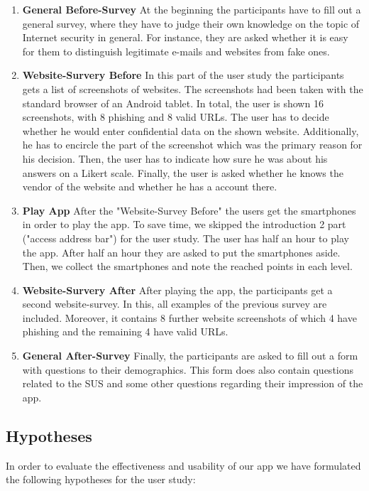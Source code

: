 \begin{enumerate}
	\item \textbf{General Before-Survey} At the beginning the participants have to fill out a general survey, where they have to judge their own knowledge on the topic of Internet security in general. For instance, they are asked whether it is easy for them to distinguish legitimate e-mails and websites from fake ones.
	\item \textbf{Website-Survery Before} In this part of the user study the participants gets a list of screenshots of websites. The screenshots had been taken with the standard browser of an Android tablet. In total, the user is shown 16 screenshots, with 8 phishing and 8 valid URLs. The user has to decide whether he would enter confidential data on the shown website. Additionally, he has to encircle the part of the screenshot which was the primary reason for his decision. Then, the user has to indicate how sure he was about his answers on a Likert scale. Finally, the user is asked whether he knows the vendor of the website and whether he has a account there.
	\item \textbf{Play App} After the "Website-Survey Before" the users get the smartphones in order to play the app. To save time, we skipped the introduction 2 part ("access address bar") for the user study. The user has half an hour to play the app. After half an hour they are asked to put the smartphones aside. Then, we collect the smartphones and note the reached points in each level.
	\item \textbf{Website-Survery After} After playing the app, the participants get a second website-survey. In this, all examples of the previous survey are included. Moreover, it contains 8 further website screenshots of which 4 have phishing and the remaining 4 have valid URLs.
	\item \textbf{General After-Survey} Finally, the participants are asked to fill out a form with questions to their demographics. This form does also contain questions related to the SUS and some other questions regarding their impression of the app.


\end{enumerate}

\subsection{Hypotheses}
In order to evaluate the effectiveness and usability of our app we have formulated the following hypotheses for the user study:

